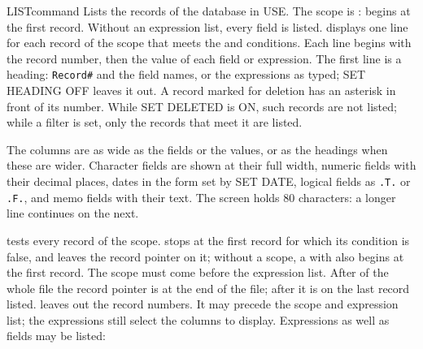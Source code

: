 \begin{XbaseEntry}{LIST}{command}
Lists the records of the database in USE.
\Syntax
{}
\Defaults
The scope is :  begins at the first record.  Without an
expression list, every field is listed.
\Usage
{} displays one line for each record of the scope that meets the
 and  conditions.  Each line begins with the record number,
then the value of each field or expression.  The first line is a heading:
\texttt{Record\#} and the field names, or the expressions as typed; SET
HEADING OFF leaves it out.  A record marked for deletion has an asterisk in
front of its number.  While SET DELETED is ON, such records are not listed;
while a filter is set, only the records that meet it are listed.

The columns are as wide as the fields or the values, or as the headings when
these are wider.  Character fields are shown at their full width, numeric
fields with their decimal places, dates in the form set by SET DATE, logical
fields as \texttt{.T.} or \texttt{.F.}, and memo fields with their text.  The
screen holds 80 characters: a longer line continues on the next.

 tests every record of the scope.   stops at the first record
for which its condition is false, and leaves the record pointer on it; without
a scope, a  with  also begins at the first record.  The
scope must come before the expression list.  After  of the whole
file the record pointer is at the end of the file; after   it is
on the last record listed.
\Options
{} leaves out the record numbers.  It may precede the scope and
expression list; the expressions still select the columns to display.
\Examples
{}
Expressions as well as fields may be listed:
\end{XbaseEntry}

